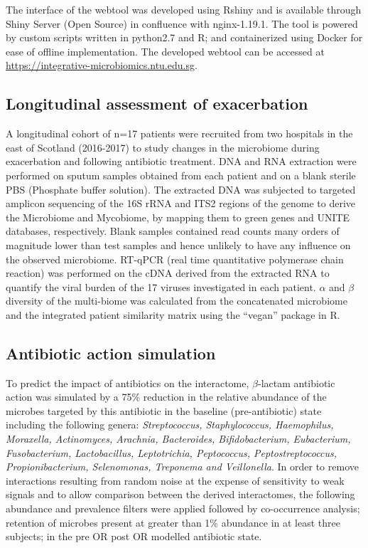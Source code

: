 The interface of the webtool was developed using Rshiny and is available through Shiny Server (Open Source) in confluence with nginx-1.19.1. The tool is powered by custom scripts written in python2.7 and R; and containerized using Docker for ease of offline implementation. The developed webtool can be accessed at \url{https://integrative-microbiomics.ntu.edu.sg}.

\subsection{Longitudinal assessment of exacerbation}

A longitudinal cohort of n=17 patients were recruited from two hospitals in the east of Scotland (2016-2017) to study changes in the microbiome during exacerbation and following antibiotic treatment. DNA and RNA extraction were performed on sputum samples obtained from each patient and on a blank sterile PBS (Phosphate buffer solution). The extracted DNA was subjected to targeted amplicon sequencing of the 16S rRNA and ITS2 regions of the genome to derive the Microbiome and Mycobiome, by mapping them to green genes and UNITE databases, respectively. Blank samples contained read counts many orders of magnitude lower than test samples and hence unlikely to have any influence on the observed microbiome. RT-qPCR (real time quantitative polymerase chain reaction) was performed on the cDNA derived from the extracted RNA to quantify the viral burden of the 17 viruses investigated in each patient. $\alpha$ and $\beta$ diversity of the multi-biome was calculated from the concatenated microbiome and the integrated patient similarity matrix using the “vegan” package in R.

\subsection{Antibiotic action simulation}

To predict the impact of antibiotics on the interactome, $\beta$-lactam antibiotic action was simulated by a 75\% reduction in the relative abundance of the microbes targeted by this antibiotic in the baseline (pre-antibiotic) state including the following genera: \emph{Streptococcus, Staphylococcus, Haemophilus, Moraxella, Actinomyces, Arachnia, Bacteroides, Bifidobacterium, Eubacterium, Fusobacterium, Lactobacillus, Leptotrichia, Peptococcus, Peptostreptococcus, Propionibacterium, Selenomonas, Treponema and Veillonella}. In order to remove interactions resulting from random noise at the expense of sensitivity to weak signals and to allow comparison between the derived interactomes, the following abundance and prevalence filters were applied followed by co-occurrence analysis; retention of microbes present at greater than 1\% abundance in at least three subjects; in the pre OR post OR modelled antibiotic state.

